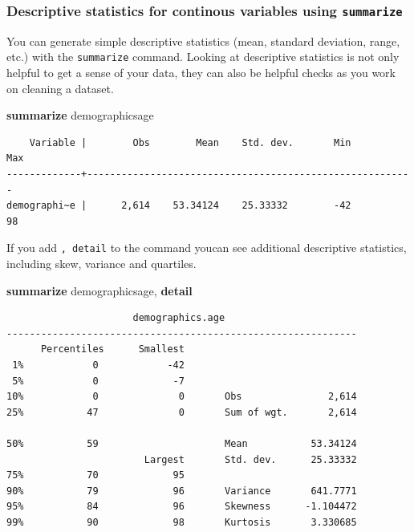 \documentclass[
]{book}
\newenvironment{Shaded}{\begin{snugshade}}{\end{snugshade}}
\newcommand{\KeywordTok}[1]{\textcolor[rgb]{0.13,0.29,0.53}{\textbf{#1}}}
\newcommand{\NormalTok}[1]{#1}
\begin{document}
\hypertarget{summarize}{%
\subsubsection*{\texorpdfstring{Descriptive statistics for continous variables using \texttt{summarize}}{Descriptive statistics for continous variables using summarize}}\label{summarize}}

You can generate simple descriptive statistics (mean, standard deviation, range, etc.) with the \texttt{summarize} command. Looking at descriptive statistics is not only helpful to get a sense of your data, they can also be helpful checks as you work on cleaning a dataset.

\begin{Shaded}
\begin{Highlighting}[]
\KeywordTok{summarize}\NormalTok{ demographicsage}
\end{Highlighting}
\end{Shaded}

\begin{verbatim}
    Variable |        Obs        Mean    Std. dev.       Min        Max
-------------+---------------------------------------------------------
demographi~e |      2,614    53.34124    25.33332        -42         98
\end{verbatim}

If you add \texttt{,\ detail} to the command youcan see additional descriptive statistics,
including skew, variance and quartiles.

\begin{Shaded}
\begin{Highlighting}[]
\KeywordTok{summarize}\NormalTok{ demographicsage, }\KeywordTok{detail}
\end{Highlighting}
\end{Shaded}

\begin{verbatim}
                      demographics.age
-------------------------------------------------------------
      Percentiles      Smallest
 1%            0            -42
 5%            0             -7
10%            0              0       Obs               2,614
25%           47              0       Sum of wgt.       2,614

50%           59                      Mean           53.34124
                        Largest       Std. dev.      25.33332
75%           70             95
90%           79             96       Variance       641.7771
95%           84             96       Skewness      -1.104472
99%           90             98       Kurtosis       3.330685
\end{verbatim}
\end{document}
